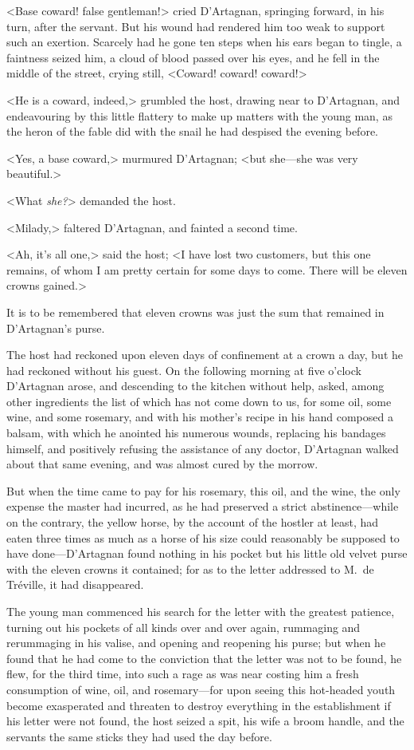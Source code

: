 <Base coward! false gentleman!> cried D'Artagnan, springing forward, in his turn, after the servant. But his wound had rendered him too weak to support such an exertion. Scarcely had he gone ten steps when his ears began to tingle, a faintness seized him, a cloud of blood passed over his eyes, and he fell in the middle of the street, crying still, <Coward! coward! coward!> 

<He is a coward, indeed,> grumbled the host, drawing near to D'Artagnan, and endeavouring by this little flattery to make up matters with the young man, as the heron of the fable did with the snail he had despised the evening before. 

<Yes, a base coward,> murmured D'Artagnan; <but she—she was very beautiful.> 

<What \emph{she?}> demanded the host. 

<Milady,> faltered D'Artagnan, and fainted a second time. 

<Ah, it's all one,> said the host; <I have lost two customers, but this one remains, of whom I am pretty certain for some days to come. There will be eleven crowns gained.> 

It is to be remembered that eleven crowns was just the sum that remained in D'Artagnan's purse. 

The host had reckoned upon eleven days of confinement at a crown a day, but he had reckoned without his guest. On the following morning at five o'clock D'Artagnan arose, and descending to the kitchen without help, asked, among other ingredients the list of which has not come down to us, for some oil, some wine, and some rosemary, and with his mother's recipe in his hand composed a balsam, with which he anointed his numerous wounds, replacing his bandages himself, and positively refusing the assistance of any doctor, D'Artagnan walked about that same evening, and was almost cured by the morrow. 

But when the time came to pay for his rosemary, this oil, and the wine, the only expense the master had incurred, as he had preserved a strict abstinence—while on the contrary, the yellow horse, by the account of the hostler at least, had eaten three times as much as a horse of his size could reasonably be supposed to have done—D'Artagnan found nothing in his pocket but his little old velvet purse with the eleven crowns it contained; for as to the letter addressed to M.~de Tréville, it had disappeared. 

The young man commenced his search for the letter with the greatest patience, turning out his pockets of all kinds over and over again, rummaging and rerummaging in his valise, and opening and reopening his purse; but when he found that he had come to the conviction that the letter was not to be found, he flew, for the third time, into such a rage as was near costing him a fresh consumption of wine, oil, and rosemary—for upon seeing this hot-headed youth become exasperated and threaten to destroy everything in the establishment if his letter were not found, the host seized a spit, his wife a broom handle, and the servants the same sticks they had used the day before. 

